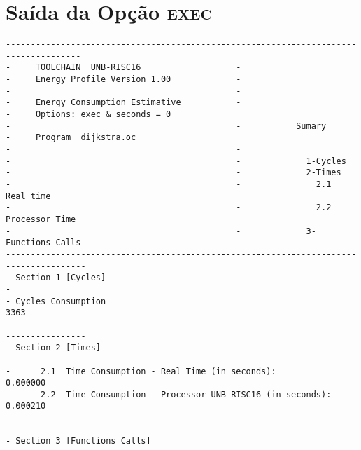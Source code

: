 \section{Saída da Opção \textsc{exec}}
\scriptsize
\begin{verbatim}
-------------------------------------------------------------------------------------
-     TOOLCHAIN  UNB-RISC16                   -                                     
-     Energy Profile Version 1.00             -                                     
-                                             -                                            
-     Energy Consumption Estimative           -                                     
-     Options: exec & seconds = 0
-                                             -           Sumary                       
-     Program  dijkstra.oc
-                                             -                                            
-                                             -             1-Cycles                     
-                                             -             2-Times                      
-                                             -               2.1    Real time           
-                                             -               2.2    Processor Time      
-                                             -             3-Functions Calls         
--------------------------------------------------------------------------------------
- Section 1 [Cycles]                                                                      
-                                                                                         
- Cycles Consumption                                                   3363                 
--------------------------------------------------------------------------------------
- Section 2 [Times]                                                                       
-                                                                                         
-      2.1  Time Consumption - Real Time (in seconds):                 0.000000                 
-      2.2  Time Consumption - Processor UNB-RISC16 (in seconds):      0.000210                 
--------------------------------------------------------------------------------------
- Section 3 [Functions Calls]       


\end{verbatim}
